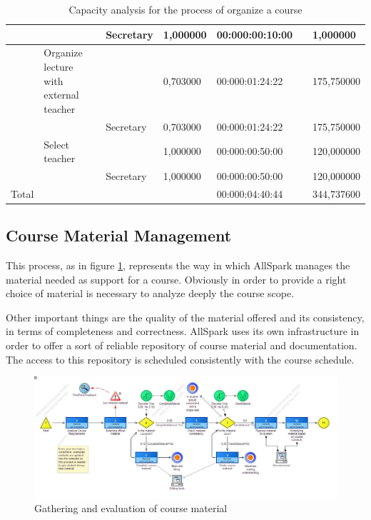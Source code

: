 \begin{landscape}
\begin{table}
{\begin{tabular}{|l|l|l|l|l|l|l|}
\hline
&&Secretary &1,000000&00:000:00:10:00&&1,000000\\
\hline
&Organize lecture with external teacher &&0,703000&00:000:01:24:22&&175,750000\\
\hline
&&Secretary &0,703000&00:000:01:24:22&&175,750000\\
\hline
&Select teacher &&1,000000&00:000:00:50:00&&120,000000\\
\hline
&&Secretary &1,000000&00:000:00:50:00&&120,000000\\
\hline
Total&&&&00:000:04:40:44&&344,737600\\
\hline
\end{tabular}
}
\caption{Capacity analysis for the process of organize a course} 
\label{2tab:course_org}
\end{table}
\end{landscape}




\subsection{Course Material Management}
This process, as in figure \ref{2img:course_material}, represents the way
in which AllSpark manages the material needed as support for a course.
Obviously in order to provide a right choice of material is necessary to
analyze deeply the course scope.

Other important things are the quality of the material offered and its
consistency, in terms of completeness and correctness. AllSpark uses its
own infrastructure in order to offer a sort of reliable repository of
course material and documentation. The access to this repository is
scheduled consistently with the course schedule.

\begin{figure}[!ht]
\centering
\includegraphics[scale=0.45, angle=90]{assign2/adonis/imgs/course_material.jpg}
\caption{Gathering and evaluation of course material}
\label{2img:course_material}
\end{figure}


